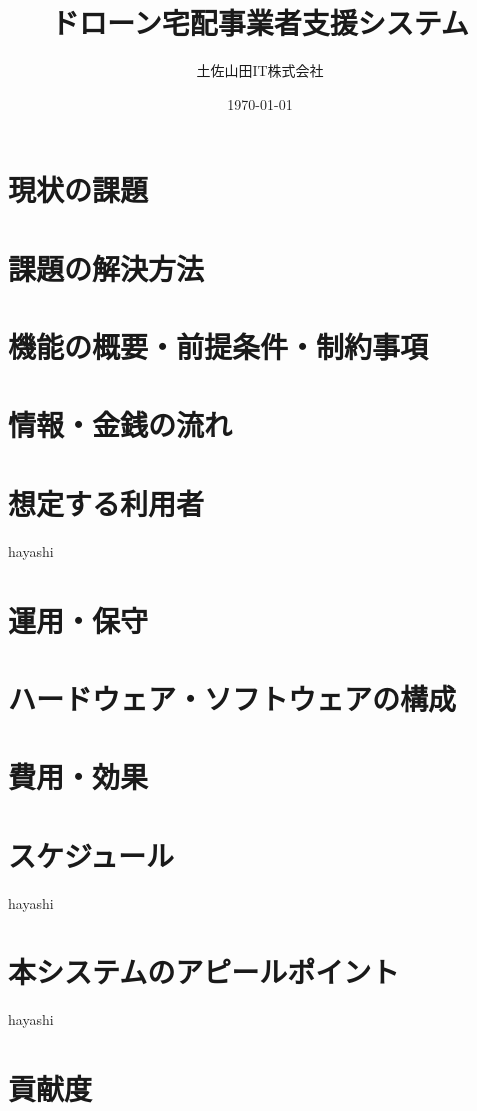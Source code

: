 \documentclass[a4paper, titlepage]{jsarticle}
\date{\today}
\title{ドローン宅配事業者支援システム}
\author{土佐山田IT株式会社}
\begin{document}
\maketitle

\tableofcontents

\clearpage

\section{現状の課題}

\section{課題の解決方法}

\section{機能の概要・前提条件・制約事項}

\section{情報・金銭の流れ}

\section{想定する利用者}
hayashi

\section{運用・保守}

\section{ハードウェア・ソフトウェアの構成}

\section{費用・効果}

\section{スケジュール}
hayashi

\section{本システムのアピールポイント}
hayashi

\section{貢献度}
\end{document}
